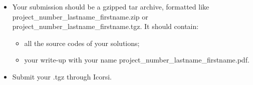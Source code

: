 \documentclass[unicode,11pt,a4paper,oneside,numbers=endperiod,openany]{scrartcl}
\begin{document}
\begin{itemize}
	\item Your submission should be a gzipped tar archive, formatted like project\_number\_lastname\_firstname.zip or project\_number\_lastname\_firstname.tgz. 
	It should contain:
	\begin{itemize}
		\item all the source codes of your solutions;
		\item your write-up with your name  project\_number\_lastname\_firstname.pdf.
	\end{itemize}
	\item Submit your .tgz through Icorsi.
\end{itemize}
\end{document}
